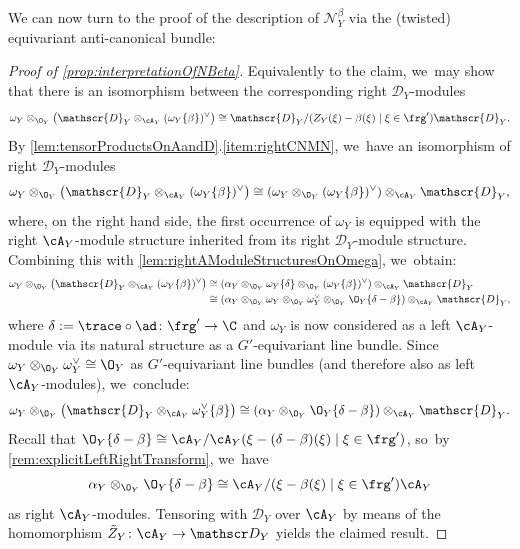 We can now turn to the proof of the description of $\mathscr N_Y^\beta$ via the (twisted) equivariant
anti-canonical bundle:

\begin{proof}[Proof of \cref{prop:interpretationOfNBeta}]
Equivalently to the claim, we~may show that there is an isomorphism between the corresponding right $\mathscr{D}_Y$\nobreakdash-mod\-ules
\[
\omega_Y \otimes_{\O_Y} \big(\mathscr{D}_Y \otimes_{\cA_Y} (\omega_Y\{\beta\})^\vee\big) \cong \mathscr{D}_Y / (Z_Y(\xi)-\beta(\xi) \mid \xi \in \frg') \mathscr{D}_Y.
\]
By \cref{lem:tensorProductsOnAandD}.\cref{item:rightCNMN}, we~have an isomorphism of right $\mathscr{D}_Y$\nobreakdash-mod\-ules
\[
\omega_Y \otimes_{\O_Y} \big(\mathscr{D}_Y \otimes_{\cA_Y} (\omega_Y\{\beta\})^\vee\big) \cong (\omega_Y \otimes_{\O_Y} (\omega_Y\{\beta\})^\vee) \otimes_{\cA_Y} \mathscr{D}_Y,
\]
where, on the right hand side, the first occurrence of $\omega_Y$ is equipped with the right $\cA_Y$\nobreakdash-mod\-ule structure inherited from its right $\mathscr{D}_Y$\nobreakdash-mod\-ule structure. Combining this with \cref{lem:rightAModuleStructuresOnOmega}, we~obtain:
\begin{align*}
\omega_Y \otimes_{\O_Y} \big(\mathscr{D}_Y \otimes_{\cA_Y} (\omega_Y\{\beta\})^\vee\big)
&\cong (\alpha_Y \otimes_{\O_Y} \omega_Y\{\delta\} \otimes_{\O_Y} (\omega_Y\{\beta\})^\vee) \otimes_{\cA_Y} \mathscr{D}_Y \\
&\cong (\alpha_Y \otimes_{\O_Y} \omega_Y \otimes_{\O_Y} \omega_Y^\vee \otimes_{\O_Y} \O_Y\{\delta-\beta\}) \otimes_{\cA_Y} \mathscr{D}_Y,
\end{align*}
where $\delta := \trace \circ \ad \colon \frg' \to \C$ and $\omega_Y$ is now considered as a left $\cA_Y$\nobreakdash-mod\-ule via its natural structure as a $G'$-equivariant line bundle. Since $\omega_Y \otimes_{\O_Y} \omega_Y^\vee \cong \O_Y$ as $G'$-equivariant line bundles (and therefore also as left $\cA_Y$\nobreakdash-mod\-ules), we~conclude:
\[
\omega_Y \otimes_{\O_Y} \big(\mathscr{D}_Y \otimes_{\cA_Y} \omega_Y^\vee\{\beta\}\big) \cong (\alpha_Y \otimes_{\O_Y} \O_Y\{\delta-\beta\}) \otimes_{\cA_Y} \mathscr{D}_Y.
\]
Recall that $\O_Y\{\delta-\beta\} \cong \cA_Y/\cA_Y(\xi-(\delta-\beta)(\xi) \mid \xi \in \frg')$, so~by \cref{rem:explicitLeftRightTransform}, we~have
\[
\alpha_Y \otimes_{\O_Y} \O_Y\{\delta-\beta\} \cong \cA_Y/(\xi-\beta(\xi) \mid \xi \in \frg') \cA_Y
\]
as right $\cA_Y$\nobreakdash-mod\-ules. Tensoring with $\mathscr{D}_Y$ over $\cA_Y$ by means of the homomorphism $\tilde{Z}_Y \colon \cA_Y \to \mathscr D_Y$ yields the claimed result.
\end{proof}


